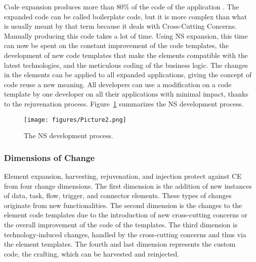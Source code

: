 Code expansion produces more than 80\% of the code of the application
\parencite{kandaswamy_systematic_2024}. The expanded code can be called boilerplate code,
but it is more complex than what is usually meant by that term because it deals with
Cross-Cutting Concerns. Manually producing this code takes a lot of time. Using NS
expansion, this time can now be spent on the constant improvement of the code templates,
the development of new code templates that make the elements compatible with the latest
technologies, and the meticulous coding of the business logic. The changes in the elements
can be applied to all expanded applications, giving the concept of code reuse a new
meaning. All developers can use a modification on a code template by one developer on all
their applications with minimal impact, thanks to the rejuvenation process.
Figure~\ref{fig_2} summarizes the NS development process.
\begin{figure}[htbp]
\centering
\centerline{\texttt{[image: figures/Picture2.png]}}
\caption{The NS development process.}
\label{fig_2}
\end{figure}
%
%
\subsubsection{Dimensions of Change}\label{Dimensions of Change} Element expansion,
harvesting, rejuvenation, and injection protect against CE from four change dimensions. The
first dimension is the addition of new instances of data, task, flow, trigger, and
connector elements. These types of changes originate from new functionalities. The second
dimension is the changes to the element code templates due to the introduction of new
cross-cutting concerns or the overall improvement of the code of the templates. The third
dimension is technology-induced changes, handled by the cross-cutting concerns and thus
via the element templates. The fourth and last dimension represents the custom code, the
crafting, which can be harvested and reinjected.

